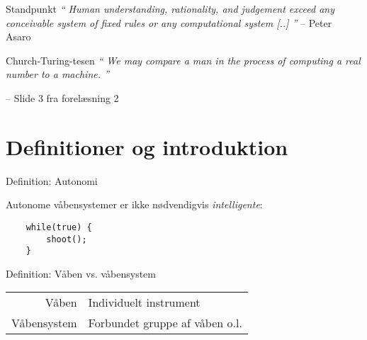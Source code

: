 
\begin{frame}{Standpunkt}
    \textit{ \enquote{
            Human understanding, rationality, and judgement exceed any
            conceivable system of fixed rules or any computational system [..]
    }}
-- Peter Asaro~\citep[p. 700]{asaro}



\end{frame}

\begin{frame}{Church-Turing-tesen}
    \textit{ \enquote{
            We may compare a man in the process of computing a real number to a
            machine.
    }}

    \tiny --
    Slide 3 fra forelæsning 2
    
\end{frame}

%
%    

\section{Definitioner og introduktion}

\begin{frame}[fragile]{Definition: Autonomi}

    Autonome våbensystemer er ikke nødvendigvis \textit{intelligente}:

    \pause

    \begin{verbatim}
    while(true) {
        shoot();
    }
    \end{verbatim}

\end{frame}

\begin{frame}{Definition: Våben vs. våbensystem}

    \begin{tabular}{ r | l }
        \hline
        Våben & Individuelt instrument \\
        Våbensystem & Forbundet gruppe af våben o.l.\\
        \hline  
    \end{tabular}
\end{frame}



